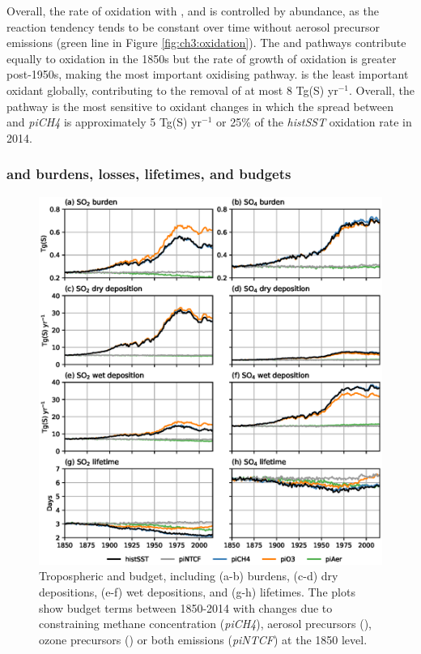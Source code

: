 Overall, the rate of  oxidation with ,  and  is controlled by  abundance, as the reaction tendency tends to be constant over time without aerosol precursor emissions (green line in Figure \ref{fig:ch3:oxidation}). The  and  pathways contribute equally to  oxidation in the 1850s but the rate of growth of  oxidation is greater post-1950s, making  the most important oxidising pathway.  is the least important oxidant globally, contributing to the removal of at most 8 Tg(S) yr$^{-1}$. Overall, the  pathway is the most sensitive to oxidant changes in which the spread between \sstpio{} and \textit{piCH4} is approximately 5 Tg(S) yr$^{-1}$ or 25\% of the \textit{histSST} oxidation rate in 2014.



\subsubsection{\texorpdfstring{}{SO2} and \texorpdfstring{}{SO4} burdens, losses, lifetimes, and budgets}

\begin{figure}
    \centering
    \includegraphics[width=\linewidth]{Chapter3/Figs/f04_s-budget.eps}
    \caption[Tropospheric sulfur budget: burdens, depositions and lifetimes]{Tropospheric  and  budget, including (a-b) burdens, (c-d) dry depositions, (e-f) wet depositions, and (g-h) lifetimes. The plots show budget terms between 1850-2014 with changes due to constraining  methane concentration (\textit{piCH4}), aerosol precursors (\sstpiaer{}), ozone precursors (\sstpio{}) or both emissions (\textit{piNTCF}) at the 1850 level.}
    \label{fig:ch3:s-burden}
\end{figure}

